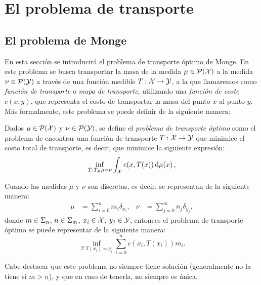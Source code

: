 \section{El problema de transporte}
 {

  \subsection*{El problema de Monge}
  {
	  En esta sección se introducirá el problema de transporte óptimo de Monge. En este problema se busca transportar la masa de la medida $\mu \in \ProbSpace[\cX]$ a la medida $\nu \in \ProbSpace[\cY]$ a través de una función medible $T: \cX \to \cY$, a la que llamaremos como \emph{función de transporte} o \emph{mapa de transporte}, utilizando una \emph{función de coste} $c(x, y)$, que representa el costo de transportar la masa del punto $x$ al punto $y$. Más formalmente, este problema se puede definir de la siguiente manera:

	  \begin{definition}
		  Dados $\mu\in \ProbSpace[\cX]$ y $\nu \in \ProbSpace[\cY]$, se define el \emph{problema de transporte óptimo} como el problema de encontrar una función de transporte $T: \cX \to \cY$ que minimice el costo total de transporte, es decir, que minimice la siguiente expresión:
		  \begin{equation}
			  \label{eq:problemaTransporte}
			  \inf_{T: \Tpf \mu = \nu} \int_{\cX} c(x, T(x)) \dmu[x],
		  \end{equation}
	  \end{definition}

	  \begin{remark}
		  \label{remark:problemaTransporteMongeDiscreto}
		  Cuando las medidas $\mu$ y $\nu$ son discretas, es decir, se representan de la siguiente manera:
		  \begin{align}
			  \mu & = \sum_{i=0}^{n} m_i \delta_{x_i}, &
			  \nu & = \sum_{j=0}^{m} n_j \delta_{y_j},
		  \end{align}
		  donde $m \in \Simplex[n]$, $n \in \Simplex[m]$, $x_i \in \cX$, $y_j \in \cY$, entonces el problema de transporte óptimo se puede representar de la siguiente manera:
		  \begin{equation}
			  \label{eq:problemaTransporteDiscreto}
			  \inf_{T: T(x_i) = y_j} \sum_{i=0}^{n} c(x_i, T(x_i)) m_i.
		  \end{equation}

		  Cabe destacar que este problema no siempre tiene solución (generalmente no la tiene si $m > n$), y que en caso de tenerla, no siempre es única.
	  \end{remark}
  }

}
